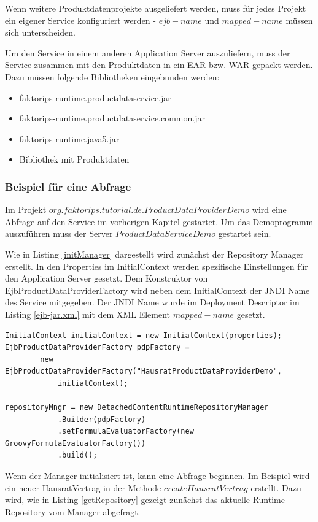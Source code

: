 \documentclass[headsepline=true, footsepline=true]{scrartcl}
\begin{document}
Wenn weitere Produktdatenprojekte ausgeliefert werden, muss für jedes Projekt
ein eigener Service konfiguriert werden - $ejb-name$ und $mapped-name$ müssen
sich unterscheiden.

Um den Service in einem anderen Application Server auszuliefern, muss der
Service zusammen mit den Produktdaten in ein EAR bzw. WAR gepackt werden. Dazu
müssen folgende Bibliotheken eingebunden werden:

\begin{itemize}
	\item faktorips-runtime.productdataservice.jar
	\item faktorips-runtime.productdataservice.common.jar
	\item faktorips-runtime.java5.jar
	\item Bibliothek mit Produktdaten
\end{itemize}

\subsubsection{Beispiel für eine Abfrage}
\label{appExample}

Im Projekt $org.faktorips.tutorial.de.ProductDataProviderDemo$ wird eine
Abfrage auf den Service im vorherigen Kapitel gestartet. Um das Demoprogramm
auszuführen muss der Server $ProductDataServiceDemo$ gestartet sein.

Wie in Listing \ref{initManager} dargestellt wird zunächst der Repository
Manager erstellt. In den Properties im InitialContext werden spezifische
Einstellungen für den Application Server gesetzt. Dem Konstruktor von
EjbProductDataProviderFactory wird neben dem InitialContext der JNDI Name des
Service mitgegeben. Der JNDI Name wurde im Deployment Descriptor im Listing
\ref{ejb-jar.xml} mit dem XML Element $mapped-name$ gesetzt.

\begin{lstlisting}[caption=Initialisierung des
Repository Managers,label=initManager]
InitialContext initialContext = new InitialContext(properties);
EjbProductDataProviderFactory pdpFactory =
		new EjbProductDataProviderFactory("HausratProductDataProviderDemo",
			initialContext);

repositoryMngr = new DetachedContentRuntimeRepositoryManager
			.Builder(pdpFactory)
			.setFormulaEvaluatorFactory(new GroovyFormulaEvaluatorFactory())
			.build();
\end{lstlisting}

Wenn der Manager initialisiert ist, kann eine Abfrage beginnen. Im Beispiel wird
ein neuer HausratVertrag in der Methode $createHausratVertrag$ erstellt. Dazu
wird, wie in Listing \ref{getRepository} gezeigt zunächst das
aktuelle Runtime Repository vom Manager abgefragt.
\end{document}
